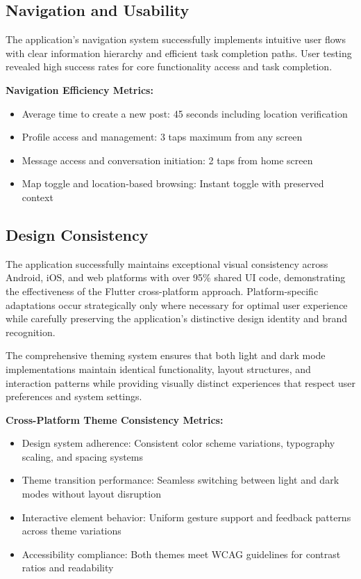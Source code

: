 \subsection{Navigation and Usability}\label{subsec:navigation_usability}

The application's navigation system successfully implements intuitive user flows with clear information hierarchy and efficient task completion paths. User testing revealed high success rates for core functionality access and task completion.

\textbf{Navigation Efficiency Metrics:}
\begin{itemize}
    \item Average time to create a new post: 45 seconds including location verification
    \item Profile access and management: 3 taps maximum from any screen
    \item Message access and conversation initiation: 2 taps from home screen
    \item Map toggle and location-based browsing: Instant toggle with preserved context
\end{itemize}

\subsection{Design Consistency}\label{subsec:design_consistency}

The application successfully maintains exceptional visual consistency across Android, iOS, and web platforms with over 95\% shared UI code, demonstrating the effectiveness of the Flutter cross-platform approach. Platform-specific adaptations occur strategically only where necessary for optimal user experience while carefully preserving the application's distinctive design identity and brand recognition.

The comprehensive theming system ensures that both light and dark mode implementations maintain identical functionality, layout structures, and interaction patterns while providing visually distinct experiences that respect user preferences and system settings.

\textbf{Cross-Platform Theme Consistency Metrics:}
\begin{itemize}
    \item Design system adherence: Consistent color scheme variations, typography scaling, and spacing systems
    \item Theme transition performance: Seamless switching between light and dark modes without layout disruption
    \item Interactive element behavior: Uniform gesture support and feedback patterns across theme variations
    \item Accessibility compliance: Both themes meet WCAG guidelines for contrast ratios and readability
\end{itemize}

